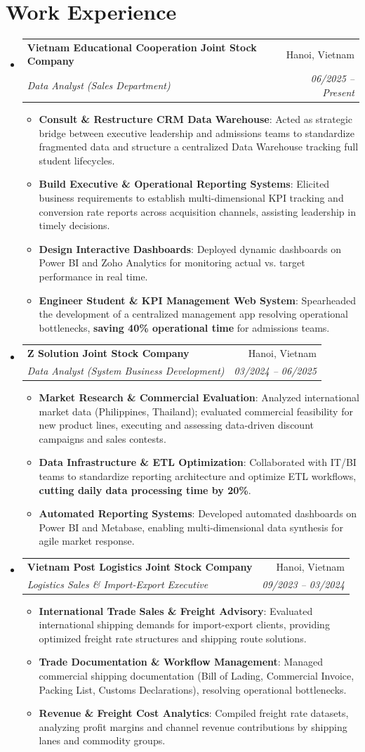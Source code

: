 \documentclass[letterpaper,11pt]{article}
\makeatletter
\newcommand{\resumeItem}[1]{
  \item\small{
    {#1 \vspace{1pt}}
  }
}
\newcommand{\resumeSubheading}[4]{
  \vspace{2pt}\item
    \begin{tabular*}{\textwidth}[t]{l@{\extracolsep{\fill}}r}
      \textbf{#1} & #2 \\
      \textit{\small#3} & \textit{\small #4} \\
    \end{tabular*}\vspace{-2pt}
}
\newcommand{\resumeSubHeadingListStart}{\begin{itemize}[leftmargin=0.15in, label={}]}
\newcommand{\resumeSubHeadingListEnd}{\end{itemize}}
\newcommand{\resumeItemListStart}{\begin{itemize}[leftmargin=0.15in, itemsep=2.5pt, topsep=2pt, parsep=1.5pt]}
\newcommand{\resumeItemListEnd}{\end{itemize}\vspace{2pt}}
\makeatother
\begin{document}
\section*{Work Experience}
  \resumeSubHeadingListStart
        \resumeSubheading
      {Vietnam Educational Cooperation Joint Stock Company}{Hanoi, Vietnam}
      {Data Analyst (Sales Department)}{06/2025 -- Present}
      \resumeItemListStart
      \resumeItem{\textbf{Consult \& Restructure CRM Data Warehouse}: Acted as strategic bridge between executive leadership and admissions teams to standardize fragmented data and structure a centralized Data Warehouse tracking full student lifecycles.}
      \resumeItem{\textbf{Build Executive \& Operational Reporting Systems}: Elicited business requirements to establish multi-dimensional KPI tracking and conversion rate reports across acquisition channels, assisting leadership in timely decisions.}
      \resumeItem{\textbf{Design Interactive Dashboards}: Deployed dynamic dashboards on Power BI and Zoho Analytics for monitoring actual vs. target performance in real time.}
      \resumeItem{\textbf{Engineer Student \& KPI Management Web System}: Spearheaded the development of a centralized management app resolving operational bottlenecks, \textbf{saving 40\% operational time} for admissions teams.}
      \resumeItemListEnd
    \resumeSubheading
      {Z Solution Joint Stock Company}{Hanoi, Vietnam}
      {Data Analyst (System Business Development)}{03/2024 -- 06/2025}
      \resumeItemListStart
      \resumeItem{\textbf{Market Research \& Commercial Evaluation}: Analyzed international market data (Philippines, Thailand); evaluated commercial feasibility for new product lines, executing and assessing data-driven discount campaigns and sales contests.}
      \resumeItem{\textbf{Data Infrastructure \& ETL Optimization}: Collaborated with IT/BI teams to standardize reporting architecture and optimize ETL workflows, \textbf{cutting daily data processing time by 20\%}.}
      \resumeItem{\textbf{Automated Reporting Systems}: Developed automated dashboards on Power BI and Metabase, enabling multi-dimensional data synthesis for agile market response.}
      \resumeItemListEnd
    \resumeSubheading
      {Vietnam Post Logistics Joint Stock Company}{Hanoi, Vietnam}
      {Logistics Sales \& Import-Export Executive}{09/2023 -- 03/2024}
      \resumeItemListStart
      \resumeItem{\textbf{International Trade Sales \& Freight Advisory}: Evaluated international shipping demands for import-export clients, providing optimized freight rate structures and shipping route solutions.}
      \resumeItem{\textbf{Trade Documentation \& Workflow Management}: Managed commercial shipping documentation (Bill of Lading, Commercial Invoice, Packing List, Customs Declarations), resolving operational bottlenecks.}
      \resumeItem{\textbf{Revenue \& Freight Cost Analytics}: Compiled freight rate datasets, analyzing profit margins and channel revenue contributions by shipping lanes and commodity groups.}
      \resumeItemListEnd
  \resumeSubHeadingListEnd
\end{document}
